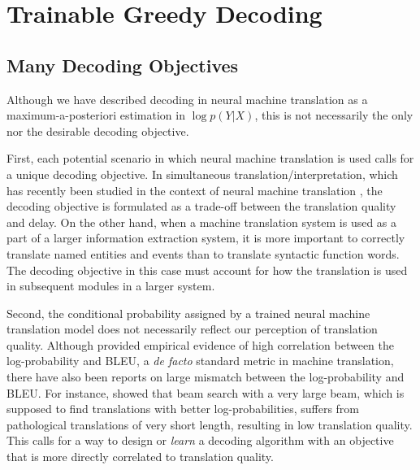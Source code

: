 

\section{Trainable Greedy Decoding}

\subsection{Many Decoding Objectives}

Although we have described decoding in neural machine translation as a maximum-a-posteriori estimation in $\log p(Y|X)$, this is not necessarily the only %
nor the desirable decoding objective. 

First, each potential scenario in which neural machine translation is used calls for a unique decoding objective. In simultaneous translation/interpretation, which has recently been studied in the context of neural machine translation \citep{gu2016learning}, the decoding objective is formulated as a trade-off between the translation quality and delay. On the other hand, when a machine translation system is used as a part of a larger information extraction system, it is more important to correctly translate named entities and events than to translate syntactic function words. The decoding objective in this case must account for how the translation is used in subsequent modules in a larger system. 

Second, the conditional probability assigned by a trained neural machine translation model does not necessarily reflect our perception of translation quality. Although \citet{cho2016noisy} provided empirical evidence of high correlation between the log-probability and BLEU, a {\it de facto} standard metric in machine translation, there have also been reports on large mismatch between the log-probability and BLEU. For instance, \citet{tu2016neural} showed that beam search with a very large beam, which is supposed to find translations with better log-probabilities, suffers from pathological translations of very short length, resulting in low translation quality. This calls for a way to design or {\it learn} a decoding algorithm with an objective that is more directly correlated to translation quality. 

